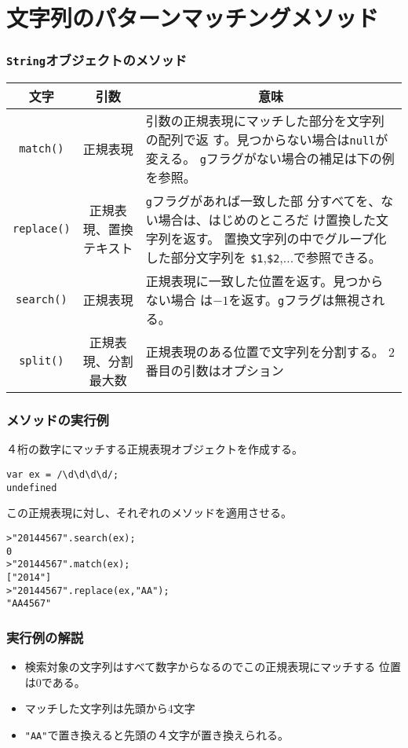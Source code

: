 \documentclass[dvipsk]{beamer}
\begin{document}
\section{文字列のパターンマッチングメソッド}
\begin{frame}[containsverbatim]
 \frametitle{\protect\texttt{String}オブジェクトのメソッド}
\begin{center}
 \begin{tabular}{|c|c|m{}|}\hline
  文字&\multicolumn{1}{c|}{引数}&\multicolumn{1}{c|}{意味}\\\hline
\verb+match()+&正規表現&引数の正規表現にマッチした部分を文字列の配列で返
	  す。見つからない場合は\verb+null+が変える。
          \verb+g+フラグがない場合の補足は下の例を参照。\\\hline
\verb+replace()+&\multicolumn{1}{m{6zw}|}{正規表現、\newline 置換テキスト}&\verb+g+フラグがあれば一致した部
	  分すべてを、ない場合は、はじめのところだ
	  け置換した文字列を返す。\newline
          置換文字列の中でグループ化した部分文字列を
	  \verb+$1+,\verb+$2+,...で参照できる。\\\hline
\verb+search()+&正規表現&正規表現に一致した位置を返す。見つからない場合
	  は$-1$を返す。\verb+g+フラグは無視される。\\\hline
\verb+split()+&\multicolumn{1}{m{5zw}|}{正規表現、\newline 分割最大数}&正規表現のある位置で文字列を分割する。
	  2番目の引数はオプション\\\hline
\end{tabular}
\end{center}
\end{frame}
\begin{frame}[containsverbatim]
 \frametitle{メソッドの実行例}
４桁の数字にマッチする正規表現オブジェクトを作成する。
\begin{verbatim}
var ex = /\d\d\d\d/;
undefined
\end{verbatim}
この正規表現に対し、それぞれのメソッドを適用させる。
\begin{verbatim}
>"20144567".search(ex);
0
>"20144567".match(ex);
["2014"]
>"20144567".replace(ex,"AA");
"AA4567"
\end{verbatim}
\end{frame}
\begin{frame}[containsverbatim]
 \frametitle{実行例の解説}
\begin{itemize}
 \item 検索対象の文字列はすべて数字からなるのでこの正規表現にマッチする
       位置は$0$である。
 \item マッチした文字列は先頭から4文字
 \item \verb+"AA"+で置き換えると先頭の４文字が置き換えられる。
\end{itemize}
\end{frame}
\end{document}
